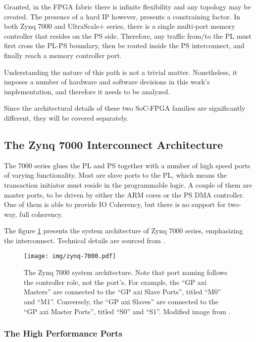 Granted, in the FPGA fabric there is infinite flexibility and any topology may be created.
The presence of a hard IP however, presents a constraining factor.
In both Zynq 7000 and UltraScale+ series, 
there is a single multi-port memory controller
that resides on the PS side. Therefore, any traffic from/to the PL must
first cross the PL-PS boundary, then be routed inside the PS interconnect,
and finally reach a memory controller port. 

Understanding the nature of this path is not a trivial matter. 
Nonetheless, it imposes a number of hardware and software decisions
in this work's implementation, and therefore it needs to be analyzed.

Since the architectural details of these two SoC-FPGA families are
significantly different, they will be covered separately.

\subsection{The Zynq 7000 Interconnect Architecture}

The 7000 series glues the PL and PS together with a number of
high speed ports of varying functionality. Most are slave ports to the
PL, which means the transaction initiator must reside in the programmable logic.
A couple of them are master ports, to be driven by either the ARM cores or
the PS DMA controller. One of them is able to provide \gls{IO Coherency},
but there is no support for two-way, full coherency.

The figure \ref{fig:zynq7000-interconnect} presents the system architecture 
of Zynq 7000 series, emphasizing the interconnect. 
Technical details are sourced from \cite{ug585}.

\begin{figure}[htbp]
  \centering
  \texttt{[image: img/zynq-7000.pdf]}
  \caption{The Zynq 7000 system architecture. 
  Note that port naming follows the controller role, not the port's.
  For example, the ``GP \gls{axi} Masters'' are connected to the
  ``GP \gls{axi} Slave Ports'', titled ``M0'' and ``M1''. Conversely,
  the ``GP \gls{axi} Slaves'' are connected to the ``GP \gls{axi} Master Ports'', titled ``S0'' and ``S1''.
  Modified image from \cite{ug585}.
  }
  \label{fig:zynq7000-interconnect}
\end{figure}

\subsubsection{The High Performance Ports}

